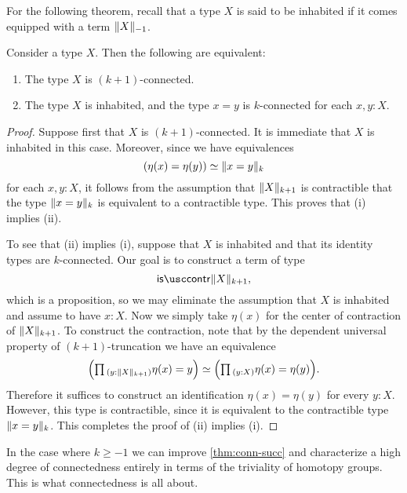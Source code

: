 For the following theorem, recall that a type $X$ is said to be inhabited if it comes equipped with a term $\trunc{-1}{X}$.

\begin{thm}\label{thm:conn-succ}
  Consider a type $X$. Then the following are equivalent:
  \begin{enumerate}
  \item The type $X$ is $(k+1)$-connected.
  \item The type $X$ is inhabited, and the type $x=y$ is $k$-connected for each $x,y:X$.
  \end{enumerate}
\end{thm}

\begin{proof}
  Suppose first that $X$ is $(k+1)$-connected. It is immediate that $X$ is inhabited in this case. Moreover, since we have equivalences
  \begin{equation*}
    (\eta(x)=\eta(y))\simeq \trunc{k}{x=y}
  \end{equation*}
  for each $x,y:X$, it follows from the assumption that $\trunc{k+1}{X}$ is contractible that the type $\trunc{k}{x=y}$ is equivalent to a contractible type. This proves that (i) implies (ii).

  To see that (ii) implies (i), suppose that $X$ is inhabited and that its identity types are $k$-connected. Our goal is to construct a term of type
  \begin{equation*}
    \iscontr\trunc{k+1}{X},
  \end{equation*}
  which is a proposition, so we may eliminate the assumption that $X$ is inhabited and assume to have $x:X$. Now we simply take $\eta(x)$ for the center of contraction of $\trunc{k+1}{X}$. To construct the contraction, note that by the dependent universal property of $(k+1)$-truncation we have an equivalence
  \begin{equation*}
    \Big(\prd{y:\trunc{k+1}{X}}\eta(x)=y\Big)\simeq\Big(\prd{y:X}\eta(x)=\eta(y)\Big).
  \end{equation*}
  Therefore it suffices to construct an identification $\eta(x)=\eta(y)$ for every $y:X$. However, this type is contractible, since it is equivalent to the contractible type $\trunc{k}{x=y}$. This completes the proof of (ii) implies (i).
\end{proof}

In the case where $k\geq -1$ we can improve \cref{thm:conn-succ} and characterize a high degree of connectedness entirely in terms of the triviality of homotopy groups. This is what connectedness is all about.

